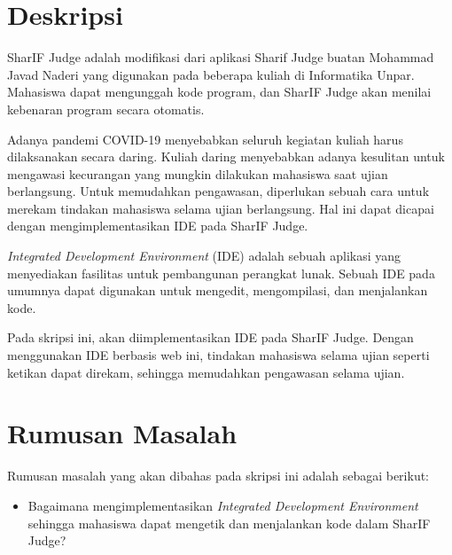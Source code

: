 \documentclass[a4paper,twoside]{article}
\begin{document}
\title{\@judultopik}
\author{\nama \textendash \@npm} 

\newcommand{\nama}{Nicholas Aditya Halim}
\newcommand{\@npm}{2017730018}
\newcommand{\@judultopik}{Implementasi Editor Kode pada SharIF Judge} %
\newcommand{\jumpemb}{1} %
\newcommand{\tanggal}{31/03/2021}


\maketitle


\section{Deskripsi}
SharIF Judge adalah modifikasi dari aplikasi Sharif Judge buatan Mohammad Javad Naderi yang digunakan pada beberapa kuliah di Informatika Unpar. Mahasiswa dapat mengunggah kode program, dan SharIF Judge akan menilai kebenaran program secara otomatis. 

Adanya pandemi COVID-19 menyebabkan seluruh kegiatan kuliah harus dilaksanakan secara daring. Kuliah daring menyebabkan adanya kesulitan untuk mengawasi kecurangan yang mungkin dilakukan mahasiswa saat ujian berlangsung. Untuk memudahkan pengawasan, diperlukan sebuah cara untuk merekam tindakan mahasiswa selama ujian berlangsung. Hal ini dapat dicapai dengan mengimplementasikan IDE pada SharIF Judge.

{\it Integrated Development Environment} (IDE) adalah sebuah aplikasi yang menyediakan fasilitas untuk pembangunan perangkat lunak. Sebuah IDE pada umumnya dapat digunakan untuk mengedit, mengompilasi, dan menjalankan kode.

Pada skripsi ini, akan diimplementasikan IDE pada SharIF Judge.  Dengan menggunakan IDE berbasis web ini, tindakan mahasiswa selama ujian seperti ketikan dapat direkam, sehingga memudahkan pengawasan selama ujian. 


\section{Rumusan Masalah}
Rumusan masalah yang akan dibahas pada skripsi ini adalah sebagai berikut:
\begin{itemize}
	\item Bagaimana mengimplementasikan {\it Integrated Development Environment} sehingga mahasiswa dapat mengetik dan menjalankan kode dalam SharIF Judge?
\end{itemize}
\end{document}
